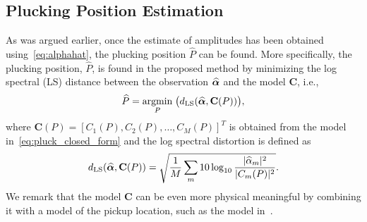 \documentclass{article}
\begin{document}
\subsection{Plucking Position Estimation} %
\label{sec:proposed_estimation_of_pluck_amplitude}
\vspace{-.6mm}
As was argued earlier, once the estimate of amplitudes has been obtained using~\eqref{eq:alphahat}, the plucking position $\widehat{P}$ can be found. More specifically, the plucking position, $\widehat{P}$, is found in the proposed method by minimizing the log spectral (LS) distance between the observation $\text{\boldmath${\widehat\alpha}$}$ and the model $\mathbf{C}$, i.e., 
\begin{equation}
    \widehat{P} = \underset{P}{\operatorname{argmin}}\;{\big(d_{\textup{LS}}(\text{\boldmath${\widehat\alpha}$},\mathbf{C}(P))\big)},
\end{equation}
where $\mathbf{C}(P) = [C_1(P),C_2(P),\dots,C_M(P)]^T$ is obtained from the model in~\eqref{eq:pluck_closed_form} and the log spectral distortion is defined as
\begin{equation}
    d_{\textup{LS}}(\text{\boldmath${\widehat\alpha}$},\mathbf{C}(P)) = \sqrt{ \frac{1}{M} \sum_m 10\log_{10} \frac{\lvert\widehat{\alpha}_m\rvert^2}{\lvert C_m(P)\rvert^2} }.
\end{equation} 
We remark that the model $\mathbf{C}$ can be even more physical meaningful by combining it with a model of the pickup location, such as the model in~\cite{DBLP:conf/icassp/MohamadDH17}.\vspace{-2mm}
%
%
%
%
\end{document}
